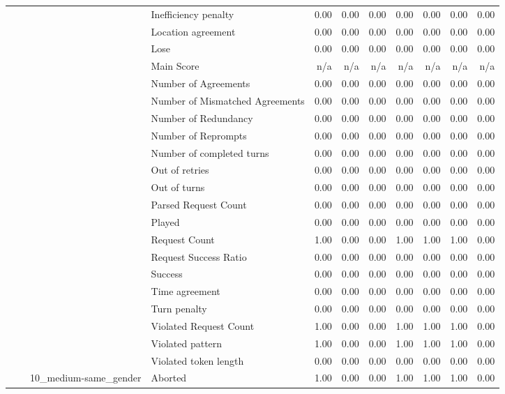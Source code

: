 \begin{tabular}{llllrrrrrrr}
 &  &  & Inefficiency penalty & 0.00 & 0.00 & 0.00 & 0.00 & 0.00 & 0.00 & 0.00 \\
 &  &  & Location agreement & 0.00 & 0.00 & 0.00 & 0.00 & 0.00 & 0.00 & 0.00 \\
 &  &  & Lose & 0.00 & 0.00 & 0.00 & 0.00 & 0.00 & 0.00 & 0.00 \\
 &  &  & Main Score & n/a & n/a & n/a & n/a & n/a & n/a & n/a \\
 &  &  & Number of Agreements & 0.00 & 0.00 & 0.00 & 0.00 & 0.00 & 0.00 & 0.00 \\
 &  &  & Number of Mismatched Agreements & 0.00 & 0.00 & 0.00 & 0.00 & 0.00 & 0.00 & 0.00 \\
 &  &  & Number of Redundancy & 0.00 & 0.00 & 0.00 & 0.00 & 0.00 & 0.00 & 0.00 \\
 &  &  & Number of Reprompts & 0.00 & 0.00 & 0.00 & 0.00 & 0.00 & 0.00 & 0.00 \\
 &  &  & Number of completed turns & 0.00 & 0.00 & 0.00 & 0.00 & 0.00 & 0.00 & 0.00 \\
 &  &  & Out of retries & 0.00 & 0.00 & 0.00 & 0.00 & 0.00 & 0.00 & 0.00 \\
 &  &  & Out of turns & 0.00 & 0.00 & 0.00 & 0.00 & 0.00 & 0.00 & 0.00 \\
 &  &  & Parsed Request Count & 0.00 & 0.00 & 0.00 & 0.00 & 0.00 & 0.00 & 0.00 \\
 &  &  & Played & 0.00 & 0.00 & 0.00 & 0.00 & 0.00 & 0.00 & 0.00 \\
 &  &  & Request Count & 1.00 & 0.00 & 0.00 & 1.00 & 1.00 & 1.00 & 0.00 \\
 &  &  & Request Success Ratio & 0.00 & 0.00 & 0.00 & 0.00 & 0.00 & 0.00 & 0.00 \\
 &  &  & Success & 0.00 & 0.00 & 0.00 & 0.00 & 0.00 & 0.00 & 0.00 \\
 &  &  & Time agreement & 0.00 & 0.00 & 0.00 & 0.00 & 0.00 & 0.00 & 0.00 \\
 &  &  & Turn penalty & 0.00 & 0.00 & 0.00 & 0.00 & 0.00 & 0.00 & 0.00 \\
 &  &  & Violated Request Count & 1.00 & 0.00 & 0.00 & 1.00 & 1.00 & 1.00 & 0.00 \\
 &  &  & Violated pattern & 1.00 & 0.00 & 0.00 & 1.00 & 1.00 & 1.00 & 0.00 \\
 &  &  & Violated token length & 0.00 & 0.00 & 0.00 & 0.00 & 0.00 & 0.00 & 0.00 \\
\cline{3-11}
 &  & \multirow[t]{27}{*}{10_medium-same_gender} & Aborted & 1.00 & 0.00 & 0.00 & 1.00 & 1.00 & 1.00 & 0.00 \\

\end{tabular}

